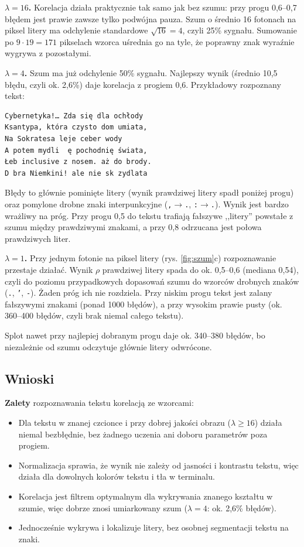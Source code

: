 \documentclass[12pt]{article}
\begin{document}
\textbf{$\lambda = 16$.} Korelacja działa praktycznie tak samo jak bez szumu: przy progu 0,6--0,7 błędem jest prawie zawsze tylko podwójna pauza. Szum o średnio 16 fotonach na piksel litery ma odchylenie standardowe $\sqrt{16} = 4$, czyli 25\% sygnału. Sumowanie po $9\cdot19 = 171$ pikselach wzorca uśrednia go na tyle, że poprawny znak wyraźnie wygrywa z pozostałymi.

\textbf{$\lambda = 4$.} Szum ma już odchylenie 50\% sygnału. Najlepszy wynik (średnio 10,5 błędu, czyli ok. 2,6\%) daje korelacja z progiem 0,6. Przykładowy rozpoznany tekst:
\begin{verbatim}
Cybernetyka!… Zda się dla ochłody
Ksantypa, która czysto dom umiata,
Na Sokratesa leje ceber wody
A potem mydli  ę pochodnię świata,
Łeb inclusive z nosem. aż do brody.
D bra Niemkini! ale nie sk zydlata
\end{verbatim}
Błędy to głównie pominięte litery (wynik prawdziwej litery spadł poniżej progu) oraz pomylone drobne znaki interpunkcyjne (\texttt{,}$\to$\texttt{.}, \texttt{:}$\to$\texttt{.}). Wynik jest bardzo wrażliwy na próg. Przy progu 0,5 do tekstu trafiają fałszywe ,,litery'' powstałe z szumu między prawdziwymi znakami, a przy 0,8 odrzucana jest połowa prawdziwych liter.

\textbf{$\lambda = 1$.} Przy jednym fotonie na piksel litery (rys. \ref{fig:szum}c) rozpoznawanie przestaje działać. Wynik $\rho$ prawdziwej litery spada do ok. 0,5--0,6 (mediana 0,54), czyli do poziomu przypadkowych dopasowań szumu do wzorców drobnych znaków (\texttt{.}, \texttt{'}, \texttt{-}). Żaden próg ich nie rozdziela. Przy niskim progu tekst jest zalany fałszywymi znakami (ponad 1000 błędów), a przy wysokim prawie pusty (ok. 360--400 błędów, czyli brak niemal całego tekstu).

Splot nawet przy najlepiej dobranym progu daje ok. 340--380 błędów, bo niezależnie od szumu odczytuje głównie litery odwrócone.

\subsection{Wnioski}

\textbf{Zalety} rozpoznawania tekstu korelacją ze wzorcami:
\begin{itemize}
    \item Dla tekstu w znanej czcionce i przy dobrej jakości obrazu ($\lambda \geq 16$) działa niemal bezbłędnie, bez żadnego uczenia ani doboru parametrów poza progiem.
    \item Normalizacja sprawia, że wynik nie zależy od jasności i kontrastu tekstu, więc działa dla dowolnych kolorów tekstu i tła w terminalu.
    \item Korelacja jest filtrem optymalnym dla wykrywania znanego kształtu w szumie, więc dobrze znosi umiarkowany szum ($\lambda = 4$: ok. 2,6\% błędów).
    \item Jednocześnie wykrywa i lokalizuje litery, bez osobnej segmentacji tekstu na znaki.
\end{itemize}
\end{document}
